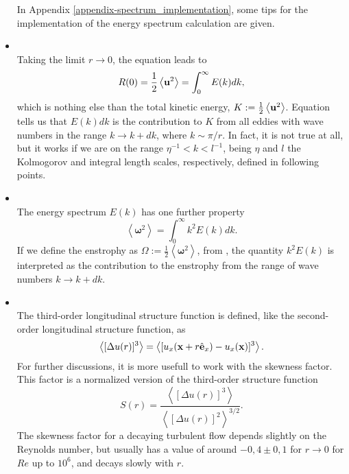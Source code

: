 \begin{itemize}
In Appendix \ref{appendix-spectrum_implementation}, some tips for the implementation of the energy spectrum calculation are given.
\item{}\\ Taking the limit $r\rightarrow 0$, the equation  leads to
\begin{equation}
\label{eq-total_kinetic_energy}
R(0)=\frac{1}{2}\left\langle{\bf u}^2\right\rangle=\int_0^\infty E(k)dk,
\end{equation}
which is nothing else than the total kinetic energy, $K:=\frac{1}{2}\left\langle{\bf u}^2\right\rangle$. Equation  tells us that $E(k)dk$ is the contribution to $K$ from all eddies with wave numbers in the range $k\rightarrow k+dk$, where $k\sim\pi/r$. In fact, it is not true at all, but it works if we are on the range $\eta^{-1}<k<l^{-1}$, being $\eta$ and $l$ the Kolmogorov and integral length scales, respectively, defined in following points.
\item{}\\ The energy spectrum $E(k)$ has one further property
\begin{equation}
\label{eq-enstrophy}
\left\langle\boldsymbol{\omega}^2\right\rangle=\int_0^\infty k^2E(k)dk.
\end{equation}
If we define the enstrophy as $\Omega:=\frac{1}{2}\left\langle\boldsymbol{\omega}^2\right\rangle$, from , the quantity $k^2E(k)$ is interpreted as the contribution to the enstrophy from the range of wave numbers $k\rightarrow k+dk$.
\item{}\\ The third-order longitudinal structure function is defined, like the second-order longitudinal structure function, as
\begin{equation*}
\label{eq-third_order_structure}
\left\langle[\Delta u(r)]^3\right\rangle=\left\langle[u_x({\bf x}+r\hat{{\bf e}}_x)-u_x({\bf x})]^3\right\rangle.
\end{equation*}
For further discussions, it is more usefull to work with the skewness factor. This factor is a normalized version of the third-order structure function
\begin{equation}
\label{eq-skewness_factor}
S(r)=\frac{\left\langle[\Delta u(r)]^3\right\rangle}{\left\langle[\Delta u(r)]^2\right\rangle^{3/2}}.
\end{equation}
The skewness factor for a decaying turbulent flow depends slightly on the Reynolds number, but usually has a value of around $-0,4\pm0,1$ for $r\rightarrow0$ for $Re$ up to $10^6$, and decays slowly with $r$.

\end{itemize}

